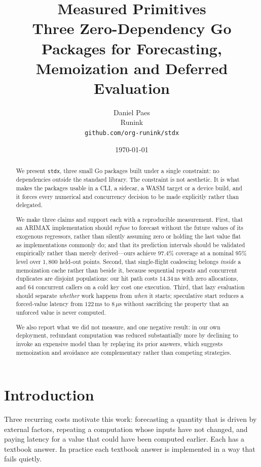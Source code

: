 \documentclass[10pt,twocolumn]{article}
\title{\textbf{Measured Primitives}\\[2pt]
\large Three Zero-Dependency Go Packages for Forecasting,\\Memoization and Deferred Evaluation}
\author{Daniel Paes\\\small Runink\\\small\texttt{github.com/org-runink/stdx}}
\date{\today}
\begin{document}
\maketitle

\begin{abstract}
We present \texttt{stdx}, three small Go packages built under a single
constraint: no dependencies outside the standard library. The constraint is not
aesthetic. It is what makes the packages usable in a CLI, a sidecar, a WASM
target or a device build, and it forces every numerical and concurrency decision
to be made explicitly rather than delegated.

We make three claims and support each with a reproducible measurement. First,
that an ARIMAX implementation should \emph{refuse} to forecast without the future
values of its exogenous regressors, rather than silently assuming zero or holding
the last value flat as implementations commonly do; and that its prediction
intervals should be validated empirically rather than merely derived---ours
achieve $97.4\%$ coverage at a nominal $95\%$ level over $1{,}800$ held-out
points. Second, that single-flight coalescing belongs \emph{inside} a memoization
cache rather than beside it, because sequential repeats and concurrent duplicates
are disjoint populations: our hit path costs $14.34$\,ns with zero allocations,
and $64$ concurrent callers on a cold key cost one execution. Third, that lazy
evaluation should separate \emph{whether} work happens from \emph{when} it
starts; speculative start reduces a forced-value latency from $122$\,ms to
$8\,\mu$s without sacrificing the property that an unforced value is never
computed.

We also report what we did not measure, and one negative result: in our own
deployment, redundant computation was reduced substantially more by declining to
invoke an expensive model than by replaying its prior answers, which suggests
memoization and avoidance are complementary rather than competing strategies.
\end{abstract}

\section{Introduction}

Three recurring costs motivate this work: forecasting a quantity that is driven
by external factors, repeating a computation whose inputs have not changed, and
paying latency for a value that could have been computed earlier. Each has a
textbook answer. In practice each textbook answer is implemented in a way that
fails quietly.
\end{document}
